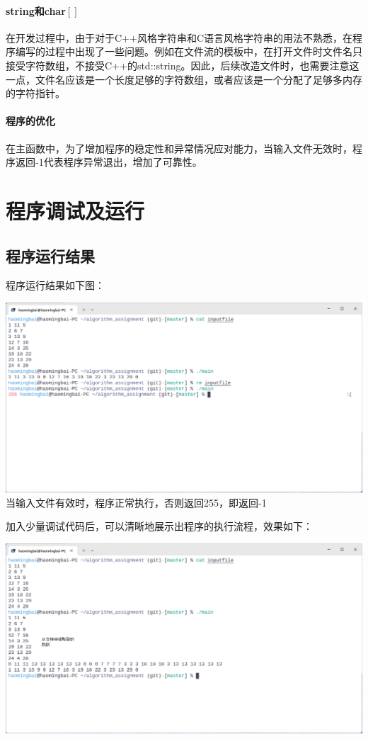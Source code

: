 \documentclass[a4paper]{ctexart}
\begin{document}
	\paragraph{string和char$[ ]$} 在开发过程中，由于对于C++风格字符串和C语言风格字符串的用法不熟悉，在程序编写的过程中出现了一些问题。例如在文件流的模板中，在打开文件时文件名只接受字符数组，不接受C++的std::string。因此，后续改造文件时，也需要注意这一点，文件名应该是一个长度足够的字符数组，或者应该是一个分配了足够多内存的字符指针。
	\paragraph{程序的优化} 在主函数中，为了增加程序的稳定性和异常情况应对能力，当输入文件无效时，程序返回-1代表程序异常退出，增加了可靠性。
	\section{程序调试及运行}
	\subsection{程序运行结果}
	程序运行结果如下图：
	\begin{center}
		\includegraphics[width=14cm]{program-output.png}
		当输入文件有效时，程序正常执行，否则返回255，即返回-1
	\end{center}
	加入少量调试代码后，可以清晰地展示出程序的执行流程，效果如下：
	\begin{center}
		\includegraphics[width=14cm]{showcase.png}
	\end{center}
\end{document}
